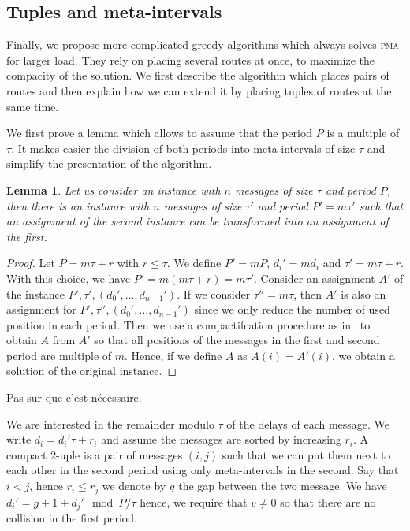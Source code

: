\documentclass[10pt, conference, letterpaper]{IEEEtran}
\newtheorem{lemma}[theorem]{Lemma}
\newcommand\pma{\textsc{pma}\xspace}
\begin{document}
\subsection{Tuples and meta-intervals}

Finally, we propose more complicated greedy algorithms which 
always solves \pma for larger load. They rely on placing several routes at once,
to maximize the compacity of the solution. We first describe the algorithm 
which places pairs of routes and then explain how we can extend it by placing tuples
of routes at the same time.

We first prove a lemma which allows to assume that the period $P$ is a multiple of $\tau$.
It makes easier the division of both periods into meta intervals of size $\tau$ and 
simplify the presentation of the algorithm.

\begin{lemma}
Let us consider an instance with $n$ messages of size $\tau$ and period $P$,
then there is an instance with $n$ messages of size $\tau'$ and period $P'= m\tau'$ such that an assignment of the second instance can be transformed into an assignment of the first.
\end{lemma}
\begin{proof}
Let $P = m \tau + r$ with $r \leq \tau$. We define $P' = mP$, $d_{i}' = m d_i$ 
and $\tau' = m \tau + r$. With this choice, we have $P' = m(m \tau + r) = m \tau'$.
Consider an assignment $A'$ of the instance $P',\tau',(d_{0}',\dots,d_{n-1}')$.
If we consider $\tau'' = m\tau$, then $A'$ is also an assignment for $P',\tau'',(d_{0}',\dots,d_{n-1}')$ since we only reduce the number of used position in each period. 
Then we use a compactifcation procedure as in~\cite{barth2018deterministic} to obtain $A$ from $A'$ so that all positions of the messages in the first and second period
are multiple of $m$. Hence, if we define $A$ as $A(i) = A'(i)$, we obtain a solution of the 
original instance.
\end{proof}
Pas sur que c'est nécessaire.

We are interested in the remainder modulo $\tau$ of the delays of each message.
We write $d_i = d_{i}'\tau + r_i$ and assume the messages are sorted by increasing $r_i$.
A compact $2$-uple is a pair of messages $(i,j)$ such that we can put them
next to each other in the second period using only meta-intervals in the second.
Say that $i < j$, hence $r_i \leq r_j$ we denote by $g$ the gap between the two message.
We have $d_{i}' = g + 1 + d_{j}' \mod P/\tau$ hence, we require that $v \neq 0$ so that
there are no collision in the first period. 
\end{document}
